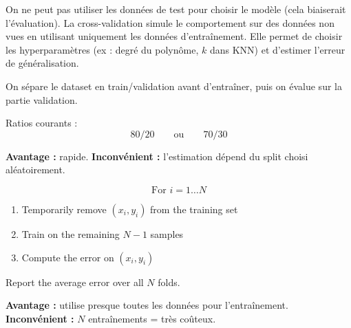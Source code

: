 \documentclass[11pt,a4paper,openany]{book}
\begin{document}
\vspace{0.8cm}

\begin{rembox}[title=Pourquoi la cross-validation ?]
On ne peut pas utiliser les données de test pour choisir le modèle (cela biaiserait l'évaluation). La cross-validation simule le comportement sur des données non vues en utilisant uniquement les données d'entraînement. Elle permet de choisir les hyperparamètres (ex : degré du polynôme, $k$ dans KNN) et d'estimer l'erreur de généralisation.
\end{rembox}

\vspace{0.8cm}

\begin{propbox}[title=Validation set]
On sépare le dataset en train/validation avant d'entraîner, puis on évalue sur la partie validation.

\vspace{0.3cm}

Ratios courants :
\[
80/20
\qquad \text{ou} \qquad
70/30
\]

\textbf{Avantage :} rapide. \textbf{Inconvénient :} l'estimation dépend du split choisi aléatoirement.
\end{propbox}

\vspace{0.6cm}

\begin{propbox}[title=Leave-one-out cross validation (LOOCV)]
\[
\text{For } i = 1 \dots N
\]

\begin{enumerate}
    \item Temporarily remove $(x_i, y_i)$ from the training set

    \item Train on the remaining $N-1$ samples

    \item Compute the error on $(x_i, y_i)$
\end{enumerate}

\vspace{0.4cm}

Report the average error over all $N$ folds.

\textbf{Avantage :} utilise presque toutes les données pour l'entraînement. \textbf{Inconvénient :} $N$ entraînements = très coûteux.
\end{propbox}

\vspace{0.6cm}
\end{document}
